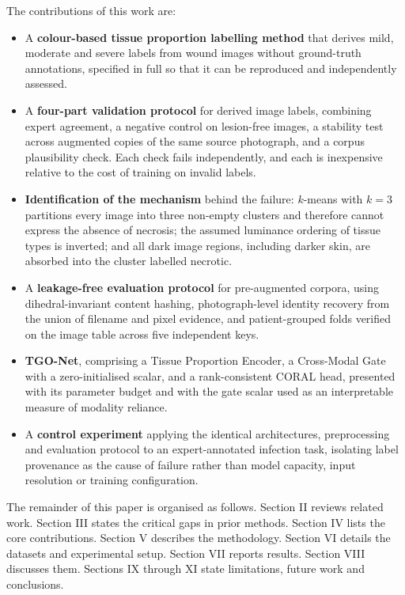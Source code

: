The contributions of this work are:

\begin{itemize}
\item A \textbf{colour-based tissue proportion labelling method} that
derives mild, moderate and severe labels from wound images without
ground-truth annotations, specified in full so that it can be reproduced
and independently assessed.

\item A \textbf{four-part validation protocol} for derived image labels,
combining expert agreement, a negative control on lesion-free images, a
stability test across augmented copies of the same source photograph, and a
corpus plausibility check. Each check fails independently, and each is
inexpensive relative to the cost of training on invalid labels.

\item \textbf{Identification of the mechanism} behind the failure:
$k$-means with $k=3$ partitions every image into three non-empty clusters
and therefore cannot express the absence of necrosis; the assumed luminance
ordering of tissue types is inverted; and all dark image regions, including
darker skin, are absorbed into the cluster labelled necrotic.

\item A \textbf{leakage-free evaluation protocol} for pre-augmented corpora,
using dihedral-invariant content hashing, photograph-level identity
recovery from the union of filename and pixel evidence, and patient-grouped
folds verified on the image table across five independent keys.

\item \textbf{TGO-Net}, comprising a Tissue Proportion Encoder, a
Cross-Modal Gate with a zero-initialised scalar, and a rank-consistent
CORAL head, presented with its parameter budget and with the gate scalar
used as an interpretable measure of modality reliance.

\item A \textbf{control experiment} applying the identical architectures,
preprocessing and evaluation protocol to an expert-annotated infection
task, isolating label provenance as the cause of failure rather than model
capacity, input resolution or training configuration.
\end{itemize}

The remainder of this paper is organised as follows. Section II reviews
related work. Section III states the critical gaps in prior methods.
Section IV lists the core contributions. Section V describes the
methodology. Section VI details the datasets and experimental setup.
Section VII reports results. Section VIII discusses them. Sections IX
through XI state limitations, future work and conclusions.

